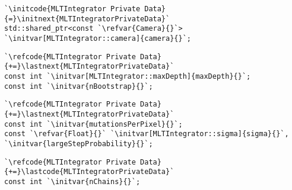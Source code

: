 \begin{lstlisting}
`\initcode{MLTIntegrator Private Data}{=}\initnext{MLTIntegratorPrivateData}`
std::shared_ptr<const `\refvar{Camera}{}`> `\initvar[MLTIntegrator::camera]{camera}{}`;
\end{lstlisting}

\begin{lstlisting}
`\refcode{MLTIntegrator Private Data}{+=}\lastnext{MLTIntegratorPrivateData}`
const int `\initvar[MLTIntegrator::maxDepth]{maxDepth}{}`;
const int `\initvar{nBootstrap}{}`;
\end{lstlisting}

\begin{lstlisting}
`\refcode{MLTIntegrator Private Data}{+=}\lastnext{MLTIntegratorPrivateData}`
const int `\initvar{mutationsPerPixel}{}`;
const `\refvar{Float}{}` `\initvar[MLTIntegrator::sigma]{sigma}{}`, `\initvar{largeStepProbability}{}`;
\end{lstlisting}

\begin{lstlisting}
`\refcode{MLTIntegrator Private Data}{+=}\lastcode{MLTIntegratorPrivateData}`
const int `\initvar{nChains}{}`;
\end{lstlisting}